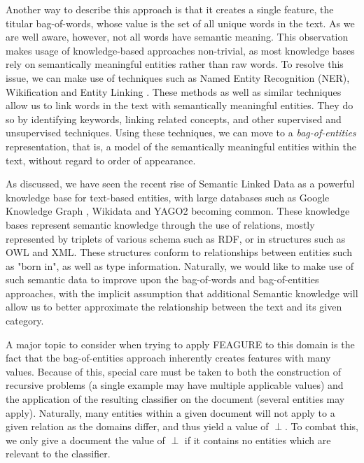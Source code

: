 \documentclass[twoside,11pt]{article}
\theoremstyle{definition}
\begin{document}
Another way to describe this approach is that it creates a single feature, the titular bag-of-words, whose value is the set of all unique words in the text.
As we are well aware, however, not all words have semantic meaning. This observation makes usage of knowledge-based approaches non-trivial, as most knowledge bases rely on semantically meaningful entities rather than raw words.
To resolve this issue, we can make use of techniques such as Named Entity Recognition (NER), Wikification \cite{bunescu2006using} and Entity Linking \cite{rao2013entity}. These methods as well as similar techniques allow us to link words in the text with semantically meaningful entities. They do so by identifying keywords, linking related concepts, and other supervised and unsupervised techniques.
Using these techniques, we can move to a \emph{bag-of-entities} representation, that is, a model of the semantically meaningful entities within the text, without regard to order of appearance.

As discussed, we have seen the recent rise of Semantic Linked Data as a powerful knowledge base for text-based entities, with large databases such as Google Knowledge Graph \cite{pelikanova2014google}, Wikidata \cite{vrandevcic2014wikidata} and YAGO2 \cite{hoffart2013yago2} becoming common. 
These knowledge bases represent semantic knowledge through the use of relations, mostly represented by triplets of various schema such as RDF, or in structures such as OWL and XML. These structures conform to relationships between entities such as "born in", as well as type information.
Naturally, we would like to make use of such semantic data to improve upon the bag-of-words and bag-of-entities approaches, with the implicit assumption that additional Semantic knowledge will allow us to better approximate the relationship between the text and its given category.

A major topic to consider when trying to apply FEAGURE to this domain is the fact that the bag-of-entities approach inherently creates features with many values. Because of this, special care must be taken to both the construction of recursive problems (a single example may have multiple applicable values) and the application of the resulting classifier on the document (several entities may apply).
Naturally, many entities within a given document will not apply to a given relation as the domains differ, and thus yield a value of $\perp$. To combat this, we only give a document the value of $\perp$ if it contains no entities which are relevant to the classifier.
\end{document}

